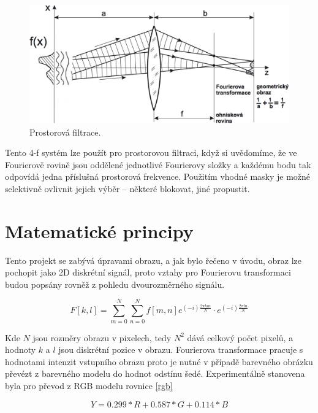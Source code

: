 \documentclass[11pt,a4paper]{article}
\begin{document}
\begin{figure}[H]
\centering
\includegraphics[width=14cm]{images/ft-cocka.png}
\caption{Prostorová filtrace.}
\label{lcpstack}
\end{figure}

Tento 4-f systém lze použít pro prostorovou filtraci, když si uvědomíme, že ve Fourierově rovině
jsou oddělené jednotlivé Fourierovy složky a každému bodu tak odpovídá jedna příslušná
prostorová frekvence. Použitím vhodné masky je možné selektivně ovlivnit jejich výběr –
některé blokovat, jiné propustit.





\section{Matematické principy}
Tento projekt se zabývá úpravami obrazu, a jak bylo řečeno v úvodu, obraz lze pochopit jako 2D diskrétní 
signál, proto vztahy pro Fourierovu transformaci budou popsány rovněž z pohledu dvourozměrného signálu.

\begin{equation}
F[k,l] = \sum_{m=0}^{N}{\sum_{n=0}^{N}{f[m,n]e^{(-i)\frac{2\pi km}{N}}\cdot e^{(-i)\frac{2\pi ln}{N}}}}
\label{dft}
\end{equation}

Kde $N$ jsou rozměry obrazu v pixelech, tedy $N^2$ dává celkový počet pixelů, a hodnoty $k$ a $l$ 
jsou diskrétní pozice v obrazu. Fourierova transformace pracuje s hodnotami intenzit vstupního obrazu
proto je nutné v případě barevného obrázku převézt z barevného modelu do hodnot odstínu šedé. Experimentálně
stanovena byla pro převod z RGB modelu rovnice \ref{rgb}

\begin{equation}
Y = 0.299*R + 0.587*G + 0.114*B
\label{rgb}
\end{equation}
\end{document}
